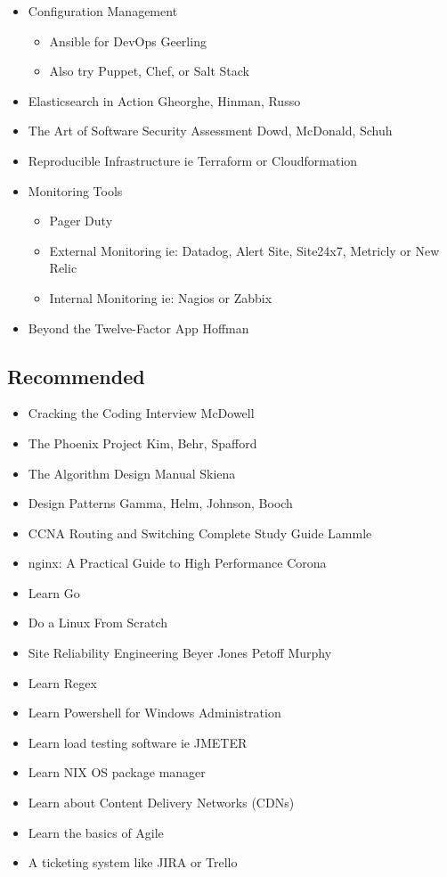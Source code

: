 \documentclass[12pt]{article}
\begin{document}
\begin{itemize}
\item Configuration Management
  \begin{itemize}
  \item Ansible for DevOps Geerling 
  \item Also try Puppet, Chef, or Salt Stack
  \end{itemize}
\item Elasticsearch in Action Gheorghe, Hinman,‎ Russo
\item The Art of Software Security Assessment Dowd, McDonald, Schuh
\item Reproducible Infrastructure ie Terraform or Cloudformation
\item Monitoring Tools
  \begin{itemize}
  \item Pager Duty
  \item External Monitoring ie: Datadog, Alert Site, Site24x7,
    Metricly or New Relic
  \item Internal Monitoring ie: Nagios or Zabbix
  \end{itemize}
\item Beyond the Twelve-Factor App Hoffman
\end{itemize}

\subsection{Recommended}
\begin{itemize}
\item Cracking the Coding Interview McDowell
\item The Phoenix Project Kim,‎ Behr,‎ Spafford
\item The Algorithm Design Manual Skiena
\item Design Patterns Gamma, Helm, Johnson, Booch
\item CCNA Routing and Switching Complete Study Guide Lammle
\item nginx: A Practical Guide to High Performance Corona
\item Learn Go
\item Do a Linux From Scratch
\item Site Reliability Engineering Beyer Jones Petoff Murphy
\item Learn Regex
\item Learn Powershell for Windows Administration
\item Learn load testing software ie JMETER
\item Learn NIX OS package manager
\item Learn about Content Delivery Networks (CDNs)
\item Learn the basics of Agile
\item A ticketing system like JIRA or Trello
\end{itemize}
\end{document}
